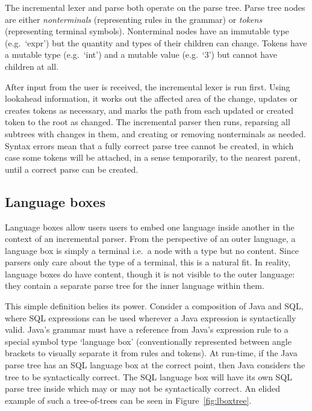 \documentclass[sigplan,screen]{acmart}\settopmatter{printfolios=true,printccs=false,printacmref=false}
\begin{document}
The incremental lexer and parse both operate on the parse tree. Parse tree nodes
are either \emph{nonterminals} (representing rules in the grammar) or
\emph{tokens} (representing terminal symbols). Nonterminal nodes have an
immutable type (e.g.~`expr') but the quantity and types of their children can change.
Tokens have a mutable type (e.g.~`int')
and a mutable value (e.g.~`3') but cannot have children at all.

After input from the user is received, the incremental lexer is run first.
Using lookahead information, it works out the affected area of the change,
updates or creates tokens as necessary, and marks the path from each updated or
created token to the root as changed. The incremental parser then runs,
reparsing all subtrees with changes in them, and creating or removing
nonterminals as needed. Syntax errors mean that a fully correct parse tree
cannot be created, in which case some tokens will be attached, in a sense
temporarily, to the nearest parent, until a correct parse can be created.


\subsection{Language boxes}

Language boxes allow users users to embed one language inside another in the
context of an incremental parser. From the perspective of an outer language, a
language box is simply a terminal i.e.~a node with a type but no content. Since
parsers only care about the type of a terminal, this is a natural fit. In
reality, language boxes do have content, though it is not visible to the outer
language: they contain a separate parse tree for the inner language within
them.

This simple definition belies its power. Consider a composition of Java and
SQL, where SQL expressions can be used wherever a Java expression is
syntactically valid. Java's grammar must have a reference from Java's
expression rule to a special symbol type `language box' (conventionally
represented between angle brackets to visually separate it from rules and
tokens). At run-time, if the Java parse tree has an SQL language box at the
correct point, then Java considers the tree to be syntactically correct. The
SQL language box will have its own SQL parse tree inside which may or may not
be syntactically correct. An elided example of such a tree-of-trees can be seen
in Figure~\ref{fig:lboxtree}.
\end{document}
